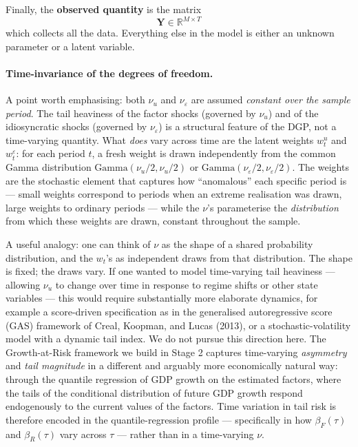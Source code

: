 \documentclass[11pt, a4paper, oneside]{article}
\newcommand{\mY}{\mathbf{Y}}
\begin{document}
Finally, the \textbf{observed quantity} is the matrix
\[
\mY \in \mathbb{R}^{M \times T}
\]
which collects all the data. Everything else in the model is either an
unknown parameter or a latent variable.

\paragraph{Time-invariance of the degrees of freedom.}
A point worth emphasising: both $\nu_u$ and $\nu_\varepsilon$ are
assumed \emph{constant over the sample period}. The tail heaviness of
the factor shocks (governed by $\nu_u$) and of the idiosyncratic shocks
(governed by $\nu_\varepsilon$) is a structural feature of the DGP, not
a time-varying quantity. What \emph{does} vary across time are the
latent weights $w^u_t$ and $w^\varepsilon_t$: for each period $t$, a
fresh weight is drawn independently from the common Gamma distribution
$\text{Gamma}(\nu_u/2, \nu_u/2)$ or
$\text{Gamma}(\nu_\varepsilon/2, \nu_\varepsilon/2)$. The weights are
the stochastic element that captures how ``anomalous'' each specific
period is — small weights correspond to periods when an extreme
realisation was drawn, large weights to ordinary periods — while the
$\nu$'s parameterise the \emph{distribution} from which these weights
are drawn, constant throughout the sample.

A useful analogy: one can think of $\nu$ as the shape of a shared
probability distribution, and the $w_t$'s as independent draws from
that distribution. The shape is fixed; the draws vary. If one wanted
to model time-varying tail heaviness — allowing $\nu_u$ to change over
time in response to regime shifts or other state variables — this
would require substantially more elaborate dynamics, for example a
score-driven specification as in the generalised autoregressive score
(GAS) framework of Creal, Koopman, and Lucas (2013), or a
stochastic-volatility model with a dynamic tail index. We do not
pursue this direction here. The Growth-at-Risk framework we build in
Stage 2 captures time-varying \emph{asymmetry} and \emph{tail
magnitude} in a different and arguably more economically natural way:
through the quantile regression of GDP growth on the estimated
factors, where the tails of the conditional distribution of future
GDP growth respond endogenously to the current values of the factors.
Time variation in tail risk is therefore encoded in the
quantile-regression profile — specifically in how $\beta_F(\tau)$ and
$\beta_R(\tau)$ vary across $\tau$ — rather than in a time-varying
$\nu$.
\end{document}
